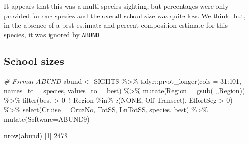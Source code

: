 \documentclass[
]{book}
\newenvironment{Shaded}{\begin{snugshade}}{\end{snugshade}}
\newcommand{\AttributeTok}[1]{\textcolor[rgb]{0.77,0.63,0.00}{#1}}
\newcommand{\CommentTok}[1]{\textcolor[rgb]{0.56,0.35,0.01}{\textit{#1}}}
\newcommand{\DecValTok}[1]{\textcolor[rgb]{0.00,0.00,0.81}{#1}}
\newcommand{\FunctionTok}[1]{\textcolor[rgb]{0.00,0.00,0.00}{#1}}
\newcommand{\NormalTok}[1]{#1}
\newcommand{\OtherTok}[1]{\textcolor[rgb]{0.56,0.35,0.01}{#1}}
\newcommand{\SpecialCharTok}[1]{\textcolor[rgb]{0.00,0.00,0.00}{#1}}
\newcommand{\StringTok}[1]{\textcolor[rgb]{0.31,0.60,0.02}{#1}}
\begin{document}
It appears that this was a multi-species sighting, but percentages were only provided for one species and the overall school size was quite low. We think that, in the absence of a best estimate and percent composition estimate for this species, it was ignored by \texttt{ABUND}.

\hypertarget{school-sizes}{%
\subsection*{School sizes}\label{school-sizes}}

\begin{Shaded}
\begin{Highlighting}[]
\CommentTok{\# Format ABUND}
\NormalTok{abund }\OtherTok{\textless{}{-}} 
\NormalTok{  SIGHTS }\SpecialCharTok{\%\textgreater{}\%} 
\NormalTok{  tidyr}\SpecialCharTok{::}\FunctionTok{pivot\_longer}\NormalTok{(}\AttributeTok{cols =} \DecValTok{31}\SpecialCharTok{:}\DecValTok{101}\NormalTok{,}
                      \AttributeTok{names\_to =} \StringTok{\textquotesingle{}species\textquotesingle{}}\NormalTok{,}
                      \AttributeTok{values\_to =} \StringTok{\textquotesingle{}best\textquotesingle{}}\NormalTok{) }\SpecialCharTok{\%\textgreater{}\%}
  \FunctionTok{mutate}\NormalTok{(}\AttributeTok{Region =} \FunctionTok{gsub}\NormalTok{(}\StringTok{\textquotesingle{} \textquotesingle{}}\NormalTok{,}\StringTok{\textquotesingle{}\textquotesingle{}}\NormalTok{,Region)) }\SpecialCharTok{\%\textgreater{}\%}
  \FunctionTok{filter}\NormalTok{(best }\SpecialCharTok{\textgreater{}} \DecValTok{0}\NormalTok{,}
         \SpecialCharTok{!}\NormalTok{ Region }\SpecialCharTok{\%in\%} \FunctionTok{c}\NormalTok{(}\StringTok{\textquotesingle{}NONE\textquotesingle{}}\NormalTok{, }\StringTok{\textquotesingle{}Off{-}Transect\textquotesingle{}}\NormalTok{),}
\NormalTok{         EffortSeg }\SpecialCharTok{\textgreater{}} \DecValTok{0}\NormalTok{) }\SpecialCharTok{\%\textgreater{}\%} 
  \FunctionTok{select}\NormalTok{(}\AttributeTok{Cruise =}\NormalTok{ CruzNo, TotSS, LnTotSS, species, best) }\SpecialCharTok{\%\textgreater{}\%} 
  \FunctionTok{mutate}\NormalTok{(}\AttributeTok{Software=}\StringTok{\textquotesingle{}ABUND9\textquotesingle{}}\NormalTok{)}

\FunctionTok{nrow}\NormalTok{(abund)}
\NormalTok{[}\DecValTok{1}\NormalTok{] }\DecValTok{2478}


\end{Highlighting}
\end{Shaded}
\end{document}
